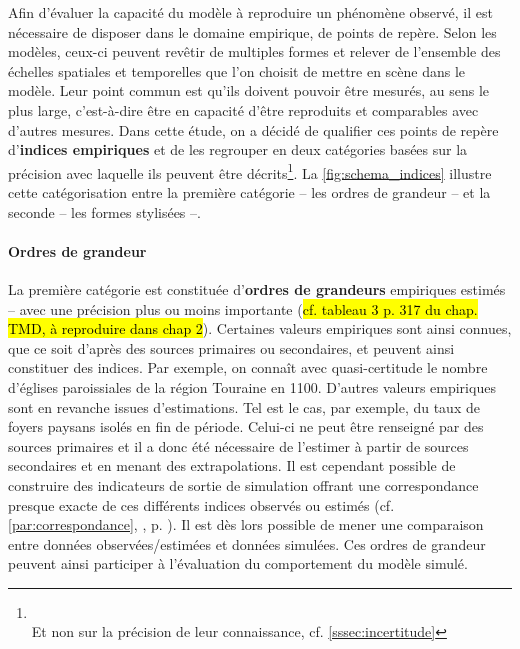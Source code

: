 Afin d’évaluer la capacité du modèle à reproduire un phénomène observé, il est nécessaire de disposer dans le domaine empirique, de \og points de repère\fg{}.
Selon les modèles, ceux-ci peuvent revêtir de multiples formes et relever de l'ensemble des échelles spatiales et temporelles que l'on choisit de mettre en scène dans le modèle.
Leur point commun est qu'ils doivent pouvoir être mesurés, au sens le plus large, c'est-à-dire être en capacité d'être reproduits et comparables avec d'autres mesures.
Dans cette étude, on a décidé de qualifier ces points de repère d'\og\textbf{indices empiriques}\fg{} et de les regrouper en deux catégories basées sur la précision avec laquelle ils peuvent être décrits\footnote{\\Et non sur la précision de leur connaissance, cf. \cref{sssec:incertitude}}.
La \cref{fig:schema_indices} illustre cette catégorisation entre la première catégorie -- les ordres de grandeur -- et la seconde -- les formes stylisées --.

\paragraph{Ordres de grandeur}
La première catégorie est constituée d'\textbf{ordres de grandeurs} empiriques estimés -- avec une précision plus ou moins importante (\hl{cf. tableau 3 p. 317 du chap. TMD, à reproduire dans chap 2}).
Certaines valeurs empiriques sont ainsi connues, que ce soit d'après des sources primaires ou secondaires, et peuvent ainsi constituer des indices.
Par exemple, on connaît avec quasi-certitude le nombre d'églises paroissiales de la région Touraine en 1100.
D'autres valeurs empiriques sont en revanche issues d'estimations.
Tel est le cas, par exemple, du taux de foyers paysans isolés en fin de période.
Celui-ci ne peut être renseigné par des sources primaires et il a donc été nécessaire de l'estimer à partir de sources secondaires et en menant des extrapolations.
Il est cependant possible de construire des indicateurs de sortie de simulation offrant une correspondance presque exacte de ces différents indices observés ou estimés (cf. \ref{par:correspondance}, , p. \pageref{par:correspondance}).
Il est dès lors possible de mener une comparaison entre données observées/estimées et données simulées.
Ces ordres de grandeur peuvent ainsi participer à l'évaluation du comportement du modèle simulé.

